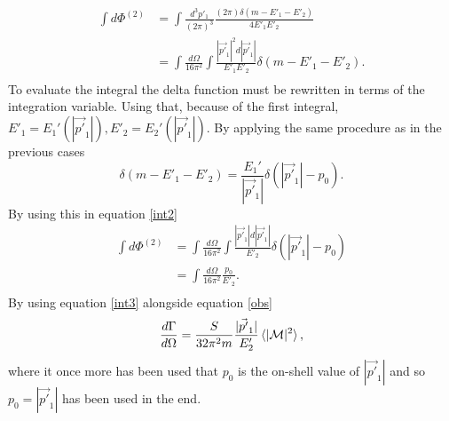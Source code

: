\begin{equation}
	\begin{split}
		\int d\Phi^{(2)}&=\int\frac{d^3p'_1}{(2\pi)^3}\frac{(2\pi)\delta(m-E'_1-E'_2)}{4E'_{1}E'_{2}}\\
		&=\int \frac{d\Omega}{16\pi^2}\int \frac{|\vec{p'}_1|^2d|\vec{p'}_1|}{E'_{1}E'_{2}}\delta(m-E'_1-E'_2).\\
	\end{split}
	\label{int2}
\end{equation} 
To evaluate the integral the delta function must be rewritten in terms of the integration variable. Using that, because of the first integral, $E'_1=E_1'(|\vec{p'}_1|), E'_2=E_2'(|\vec{p'}_1|)$. By applying the same procedure as in the previous cases
\begin{equation}
	\delta(m-E'_1-E'_2)=\frac{E_1'}{|\vec{p'}_1|}\delta(|\vec{p'}_1|-p_0).
\end{equation} 
By using this in equation \ref{int2}
\begin{equation}
	\begin{split}
		\int d\Phi^{(2)}&=\int \frac{d\Omega}{16\pi^2}\int \frac{|\vec{p'}_1|d|\vec{p'}_1|}{E'_{2}}\delta(|\vec{p'}_1|-p_0)\\
		&=\int \frac{d\Omega}{16\pi^2}\frac{p_0}{E'_{2}}.\\
	\end{split}
	\label{int3}
\end{equation} 
By using equation \eqref{int3} alongside equation \eqref{obs}
\begin{equation}
	\frac{d\Gamma}{d\Omega}=\frac{S}{32\pi^2m}\frac{|\vec{p'}_1|}{E'_{2}}\braket{|\mathcal{M}|^2},
\end{equation} 
where it once more has been used that $p_0$ is the on-shell value of $|\vec{p'}_1|$ and so $p_0=|\vec{p'}_1|$ has been used in the end.

